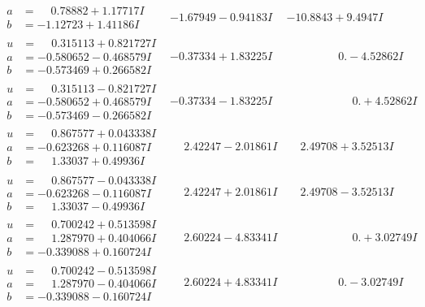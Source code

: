 \documentclass[1p]{elsarticle_modified}
\theoremstyle{definition}
\begin{document}
$$\begin{array}{c|c|c}
\begin{aligned}
a &= \phantom{-}0.78882 + 1.17717 I \\
b &= -1.12723 + 1.41186 I\end{aligned}
 & -1.67949 - 0.94183 I & -10.8843 + 9.4947 I \\ \hline\begin{aligned}
u &= \phantom{-}0.315113 + 0.821727 I \\
a &= -0.580652 - 0.468579 I \\
b &= -0.573469 + 0.266582 I\end{aligned}
 & -0.37334 + 1.83225 I & \phantom{-0.000000 } 0. - 4.52862 I \\ \hline\begin{aligned}
u &= \phantom{-}0.315113 - 0.821727 I \\
a &= -0.580652 + 0.468579 I \\
b &= -0.573469 - 0.266582 I\end{aligned}
 & -0.37334 - 1.83225 I & \phantom{-0.000000 -}0. + 4.52862 I \\ \hline\begin{aligned}
u &= \phantom{-}0.867577 + 0.043338 I \\
a &= -0.623268 + 0.116087 I \\
b &= \phantom{-}1.33037 + 0.49936 I\end{aligned}
 & \phantom{-}2.42247 - 2.01861 I & \phantom{-}2.49708 + 3.52513 I \\ \hline\begin{aligned}
u &= \phantom{-}0.867577 - 0.043338 I \\
a &= -0.623268 - 0.116087 I \\
b &= \phantom{-}1.33037 - 0.49936 I\end{aligned}
 & \phantom{-}2.42247 + 2.01861 I & \phantom{-}2.49708 - 3.52513 I \\ \hline\begin{aligned}
u &= \phantom{-}0.700242 + 0.513598 I \\
a &= \phantom{-}1.287970 + 0.404066 I \\
b &= -0.339088 + 0.160724 I\end{aligned}
 & \phantom{-}2.60224 - 4.83341 I & \phantom{-0.000000 -}0. + 3.02749 I \\ \hline\begin{aligned}
u &= \phantom{-}0.700242 - 0.513598 I \\
a &= \phantom{-}1.287970 - 0.404066 I \\
b &= -0.339088 - 0.160724 I\end{aligned}
 & \phantom{-}2.60224 + 4.83341 I & \phantom{-0.000000 } 0. - 3.02749 I \\ \hline\begin{aligned}

\end{aligned}
\end{array}$$
\end{document}
